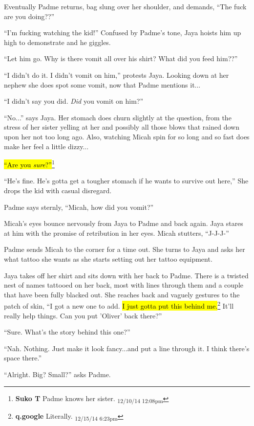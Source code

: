 Eventually Padme returns, bag slung over her shoulder, and demands, ``The fuck are you doing??''

``I'm fucking watching the kid!'' Confused by Padme's tone, Jaya hoists him up high to demonstrate and he giggles.

``Let him go.  Why is there vomit all over his shirt? What did you feed him??''

``I didn't do it.  I didn't vomit on him,'' protests Jaya.  Looking down at her nephew she does spot some vomit, now that Padme mentions it... 

``I didn't say you did.  \textit{Did} you vomit on him?''

``No...'' says Jaya.  Her stomach does churn slightly at the question, from the stress of her sister yelling at her and possibly all those blows that rained down upon her not too long ago.  Also, watching Micah spin for so long and so fast does make her feel a little dizzy... 

\hl{``Are you \textit{sure}?''}\footnote{\textbf{Suko T }Padme knows her sister. \textsubscript{12/10/14 12:08pm}}

``He's fine.  He's gotta get a tougher stomach if he wants to survive out here,'' She drops the kid with casual disregard.  

Padme says sternly, ``Micah, how did you vomit?'' 

Micah's eyes bounce nervously from Jaya to Padme and back again.  Jaya stares at him with the promise of retribution in her eyes.   Micah stutters, ``J-J-J-''

Padme sends Micah to the corner for a time out.  She turns to Jaya and asks her what tattoo she wants as she starts setting out her tattoo equipment.

Jaya takes off her shirt and sits down with her back to Padme.  There is a twisted nest of names tattooed on her back, most with lines through them and a couple that have been fully blacked out.  She reaches back and vaguely gestures to the patch of skin, ``I got a new one to add.  \hl{I just gotta put this behind me.}\footnote{\textbf{q.google }Literally. \textsubscript{12/15/14 6:23pm}}  It'll really help things.  Can you put 'Oliver' back there?''

``Sure.  What's the story behind this one?''

``Nah.  Nothing.  Just make it look fancy...and put a line through it.  I think there's space there.''

``Alright. Big?  Small?'' asks Padme.


